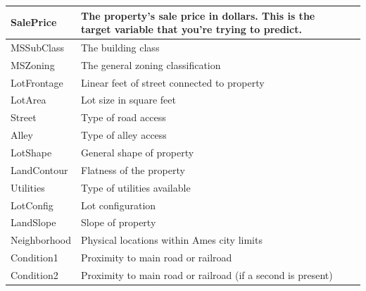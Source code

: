 \begin{longtable}{|l|p{3cm}|p{4cm}|}
    \hline
    SalePrice        & The property's sale price in dollars. This is the target variable that you're trying to predict. \\
    \hline
    MSSubClass       & The building class                                                                               \\
    \hline
    MSZoning         & The general zoning classification                                                                \\
    \hline
    LotFrontage      & Linear feet of street connected to property                                                      \\
    \hline
    LotArea          & Lot size in square feet                                                                          \\
    \hline
    Street           & Type of road access                                                                              \\
    \hline
    Alley            & Type of alley access                                                                             \\
    \hline
    LotShape         & General shape of property                                                                        \\
    \hline
    LandContour      & Flatness of the property                                                                         \\
    \hline
    Utilities        & Type of utilities available                                                                      \\
    \hline
    LotConfig        & Lot configuration                                                                                \\
    \hline
    LandSlope        & Slope of property                                                                                \\
    \hline
    Neighborhood     & Physical locations within Ames city limits                                                       \\
    \hline
    Condition1       & Proximity to main road or railroad                                                               \\
    \hline
    Condition2       & Proximity to main road or railroad (if a second is present)                                      \\

\end{longtable}
